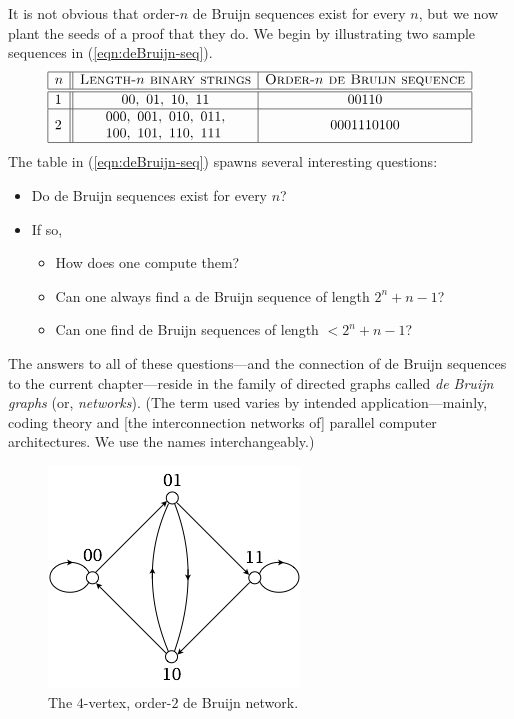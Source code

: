 It is not obvious that order-$n$ de Bruijn sequences exist for every $n$, but we now plant the
seeds of a proof that they do.  We begin by illustrating two sample sequences in (\ref{eqn:deBruijn-seq}).
\begin{equation}
\label{eqn:deBruijn-seq}
\begin{array}{|l||c|c|}
\hline
n & \mbox{\sc Length-$n$ binary strings}
    & \mbox{\sc Order-$n$ de Bruijn sequence} \\
\hline
\hline
1 &
00, \ 01, \ 10, \ 11  & 00110 \\
\hline
2 &
\begin{array}{l}
000, \ 001, \ 010, \ 011, \\
100, \ 101, \ 110, \ 111 
\end{array}
  & 0001110100 \\
\hline
\end{array}
\end{equation}
The table in (\ref{eqn:deBruijn-seq}) spawns several interesting questions:
\begin{itemize}
\item
Do de Bruijn sequences exist for every $n$?
\medskip\item
If so, 
  \begin{itemize}
  \item
How does one compute them?
  \medskip\item
Can one always find a de Bruijn sequence of length $2^n +n-1$?
  \medskip\item
Can one find de Bruijn sequences of length $< 2^n +n-1$?
  \end{itemize}
\end{itemize}
The answers to all of these questions---and the connection of de Bruijn sequences to the current chapter---reside in the family of directed graphs called {\it de Bruijn graphs} (or, {\it networks}).
(The term used varies by intended application---mainly, coding theory and [the interconnection networks of] parallel computer architectures.  We use the names interchangeably.)
 
\begin{figure}[hbt]
\begin{center}
       \includegraphics[scale=0.45]{FiguresGraph/dB2by2}
       \caption{The $4$-vertex, order-$2$ de Bruijn network.}
  \label{fig:dB2by2}
\end{center}
\end{figure}

